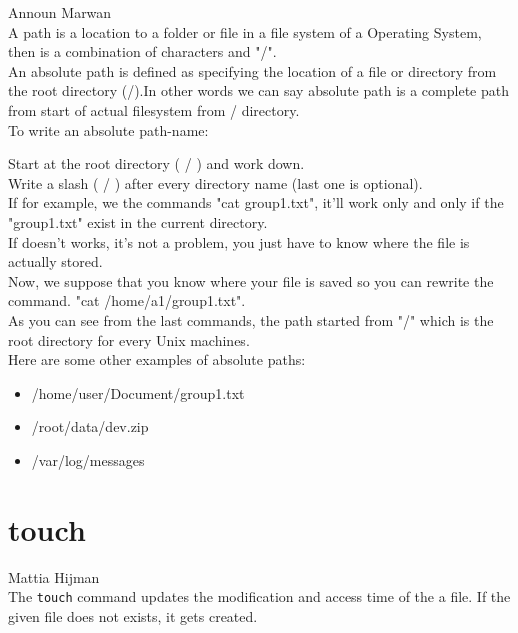 \documentclass[hidelinks,12pt,a4paper,numbers=enddot]{scrartcl}
\begin{document}
\large Announ Marwan \normalsize\\



A path is a location to a folder or file in a file system of a Operating System,
then is a combination of characters and "/".\\

An absolute path is defined as specifying the location of a file or directory
from the root directory (/).In other words we can say absolute path is a complete
path from start of actual filesystem from / directory.\\

To write an absolute path-name:

Start at the root directory ( / ) and work down.\\
Write a slash ( / ) after every directory name (last one is optional).\\

If for example, we the commands "cat group1.txt", it'll work only and only if the "group1.txt"
exist in the current directory.\\
If doesn't works, it's not a problem, you just have to know where the file is actually stored.\\
Now, we suppose that you know where your file is saved so you can rewrite the command.
"cat /home/a1/group1.txt".\\

As you can see from the last commands, the path started from "/" which is the root directory
for every Unix machines.\\

Here are some other examples of absolute paths:

\begin{itemize}
    \item /home/user/Document/group1.txt
    \item /root/data/dev.zip
    \item /var/log/messages
\end{itemize}

\section{touch}


\large Mattia Hijman \normalsize\\



The \texttt{touch} command updates the modification and access time of the a file.
If the given file does not exists, it gets created.\\
\end{document}
